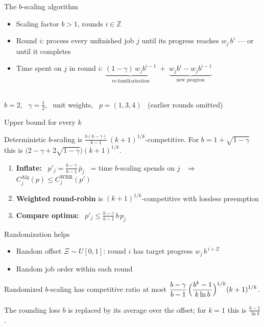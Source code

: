 \documentclass[aspectratio=169,11pt]{beamer}
\newcommand{\Alg}{\mathrm{Alg}}
\newcommand{\WRR}{\mathrm{WRR}}
\begin{document}
\begin{frame}{The $b$-scaling algorithm}
  \begin{itemize}
    \item Scaling factor $b > 1$, rounds $i \in \mathbb{Z}$
    \item Round $i$: process every unfinished job $j$ until its progress
          reaches $w_j\, b^{i}$ --- or until it completes
    \item Time spent on $j$ in round $i$:\quad
          $\underbrace{(1-\gamma)\,w_j b^{i-1}}_{\text{re-familiarization}}
           \;+\; \underbrace{w_j b^{i} - w_j b^{i-1}}_{\text{new progress}}$
  \end{itemize}
  \vfill
  \centering
  \\[2pt]
  {\footnotesize\color{ztgray} $b = 2$, \ $\gamma = \tfrac12$, \ unit weights, \ $p = (1,3,4)$ \ (earlier rounds omitted)}
\end{frame}

\begin{frame}{Upper bound for every $k$}
  \begin{theorem}
    Deterministic $b$-scaling is $\frac{b(b-\gamma)}{b-1}\,(k+1)^{1/k}$-competitive.
    For $b = 1+\sqrt{1-\gamma}$ this is $\bigl(2-\gamma+2\sqrt{1-\gamma}\bigr)(k+1)^{1/k}$.
  \end{theorem}
  \centering
  
  \vfill
  \begin{enumerate}
    \item \textbf{Inflate:} \ $p'_j = \frac{b-\gamma}{b-1}\,\bar p_j$ \ = time $b$-scaling
          spends on $j$ \ $\Rightarrow$ \ $C^{\Alg}_j(p) \le C^{\WRR}_j(p')$
    \item \textbf{Weighted round-robin} is $(k+1)^{1/k}$-competitive with lossless preemption
    \item \textbf{Compare optima:} \ $p'_j \le \frac{b-\gamma}{b-1}\, b\, p_j$
  \end{enumerate}
\end{frame}

\begin{frame}{Randomization helps}
  \begin{itemize}
    \item Random offset $\Xi \sim U[0,1]$: round $i$ has target progress $w_j\, b^{\,i+\Xi}$
    \item Random job order within each round
  \end{itemize}
  \vfill
  \centering
  
  \vfill
  \begin{theorem}
    Randomized $b$-scaling has competitive ratio at most
    $\displaystyle \frac{b-\gamma}{b-1}\,\Bigl(\frac{b^{k}-1}{k \ln b}\Bigr)^{1/k}(k+1)^{1/k}$.
  \end{theorem}
  {\footnotesize\color{ztgray} The rounding loss $b$ is replaced by its average over the offset;
   for $k=1$ this is $\frac{b-1}{\ln b}$.}
\end{frame}
\end{document}
